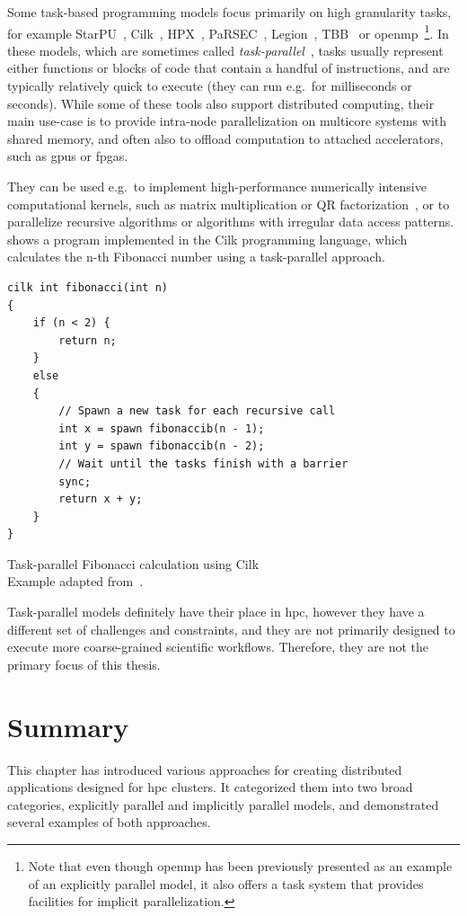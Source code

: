 Some task-based programming models focus primarily on high granularity tasks, for example
StarPU~\cite{starpu}, Cilk~\cite{cilk}, HPX~\cite{hpx},
PaRSEC~\cite{parsec}, Legion~\cite{legion}, TBB~\cite{tbb} or
\gls{openmp}~\cite{openmp}\footnote{Note that even though \gls{openmp} has been previously presented as an example of an
explicitly parallel model, it also offers a task system that provides facilities for implicit parallelization.}. In these models, which are
sometimes called \emph{task-parallel}~\cite{task_based_taxonomy}, tasks usually represent either
functions or blocks of code that contain a handful of instructions, and are typically relatively
quick to execute (they can run e.g.\ for milliseconds or seconds). While some of these tools also
support distributed computing, their main use-case is to provide intra-node parallelization on
multicore systems with shared memory, and often also to offload computation to attached
accelerators, such as \glspl{gpu} or \glspl{fpga}.

They can be used e.g.\ to implement high-performance numerically intensive computational kernels,
such as matrix multiplication or QR factorization~\cite{qr_factorization}, or to parallelize
recursive algorithms or algorithms with irregular data access patterns. 
shows a program implemented in the Cilk programming language, which calculates the n-th Fibonacci
number using a task-parallel approach.

\begin{listing}
	\begin{verbatim}
cilk int fibonacci(int n)
{
	if (n < 2) {
		return n;
	}
	else
	{
		// Spawn a new task for each recursive call
		int x = spawn fibonaccib(n - 1);
		int y = spawn fibonaccib(n - 2);
		// Wait until the tasks finish with a barrier
		sync;
		return x + y;
	}
}
	\end{verbatim}
	\caption{Task-parallel Fibonacci calculation using Cilk\\Example adapted from~\cite{cilk}.}
	\label{lst:cilk-fibonacci}
\end{listing}

Task-parallel models definitely have their place in \gls{hpc}, however they have a
different set of challenges and constraints, and they are not primarily designed to execute more
coarse-grained scientific workflows. Therefore, they are not the primary focus of this thesis.

\section*{Summary}
This chapter has introduced various approaches for creating distributed applications designed for
\gls{hpc} clusters. It categorized them into two broad categories, explicitly
parallel and implicitly parallel models, and demonstrated several examples of both approaches.

